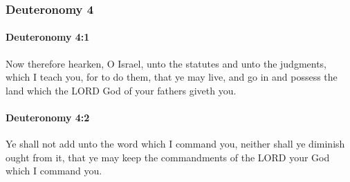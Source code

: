 	\subsubsection{Deuteronomy 4} %
		\label{DEUTERONOMY-4}

		\paragraph{Deuteronomy 4:1} %
			\label{DEUTERONOMY-4-1}

			Now therefore hearken, O Israel, unto the statutes and unto the judgments, which I teach you, for to do them, that ye may live, and go in and possess the land which the LORD God of your fathers giveth you.


		\paragraph{Deuteronomy 4:2} %
			\label{DEUTERONOMY-4-2}

			Ye shall not add unto the word which I command you, neither shall ye diminish ought from it, that ye may keep the commandments of the LORD your God which I command you.

